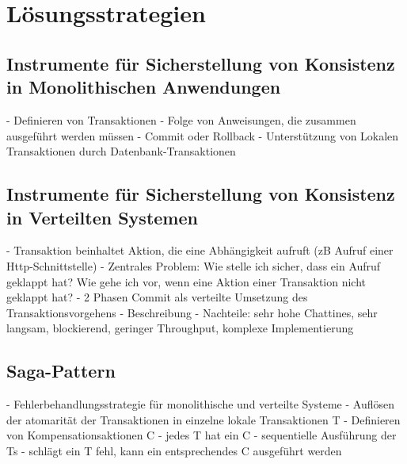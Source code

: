 \section{Lösungsstrategien}

\subsection{Instrumente für Sicherstellung von Konsistenz in Monolithischen Anwendungen}
- Definieren von Transaktionen
- Folge von Anweisungen, die zusammen ausgeführt werden müssen
- Commit oder Rollback
- Unterstützung von Lokalen Transaktionen durch Datenbank-Transaktionen

\subsection{Instrumente für Sicherstellung von Konsistenz in Verteilten Systemen}
- Transaktion beinhaltet Aktion, die eine Abhängigkeit aufruft (zB Aufruf einer Http-Schnittstelle)
- Zentrales Problem: Wie stelle ich sicher, dass ein Aufruf geklappt hat? Wie gehe ich vor, wenn eine Aktion einer Transaktion nicht geklappt hat?
- 2 Phasen Commit als verteilte Umsetzung des Transaktionsvorgehens
- Beschreibung
- Nachteile: sehr hohe Chattines, sehr langsam, blockierend, geringer Throughput, komplexe Implementierung

\subsection{Saga-Pattern}
- Fehlerbehandlungsstrategie für monolithische und verteilte Systeme
- Auflösen der atomarität der Transaktionen in einzelne lokale Transaktionen T
- Definieren von Kompensationsaktionen C
- jedes T hat ein C
- sequentielle Ausführung der Ts
- schlägt ein T fehl, kann ein entsprechendes C ausgeführt werden